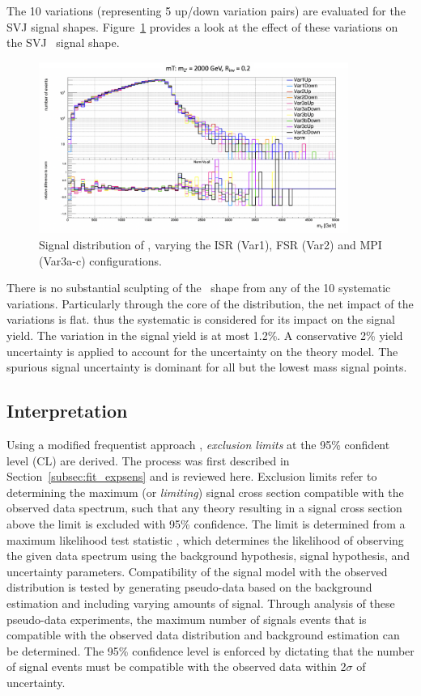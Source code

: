 The 10 variations (representing 5 up/down variation pairs) are evaluated for the SVJ signal shapes. 
Figure~\ref{fig:isrfsr} provides a look at the effect of these variations on the SVJ \mt~signal shape. 

\begin{figure}[!htbp]
\centering
   \includegraphics[width=0.9\textwidth]{figures/systs/isrfsr}
    \caption{Signal distribution of \mt, varying the ISR (Var1), FSR (Var2) and MPI (Var3a-c) configurations.
    \label{fig:isrfsr}}
\end{figure}

There is no substantial sculpting of the \mt~shape from any of the 10 systematic variations.
Particularly through the core of the distribution, the net impact of the variations is flat.
thus the systematic is considered for its impact on the signal yield.
The variation in the signal yield is at most 1.2\%.
A conservative 2\% yield uncertainty is applied to account for the uncertainty on the theory model.
The spurious signal uncertainty is dominant for all but the lowest mass signal points.

\subsection{Interpretation}
Using a modified frequentist approach \cite{freq}, \textit{exclusion limits} at the 95\% confident level (CL) are derived.
The process was first described in Section~\ref{subsec:fit_expsens} and is reviewed here.
Exclusion limits refer to determining the maximum (or \textit{limiting}) signal cross section compatible with the observed data spectrum, such that any theory resulting in a signal cross section above the limit is excluded with 95\% confidence. 
The limit is determined from a maximum likelihood test statistic \cite{likelihood}, which determines the likelihood of observing the given data spectrum using the background hypothesis, signal hypothesis, and uncertainty parameters.
Compatibility of the signal model with the observed distribution is tested by generating pseudo-data based on the background estimation and including varying amounts of signal.
Through analysis of these pseudo-data experiments, the maximum number of signals events that is compatible with the observed data distribution and background estimation can be determined.
The 95\% confidence level is enforced by dictating that the number of signal events must be compatible with the observed data within 2$\sigma$ of uncertainty.

